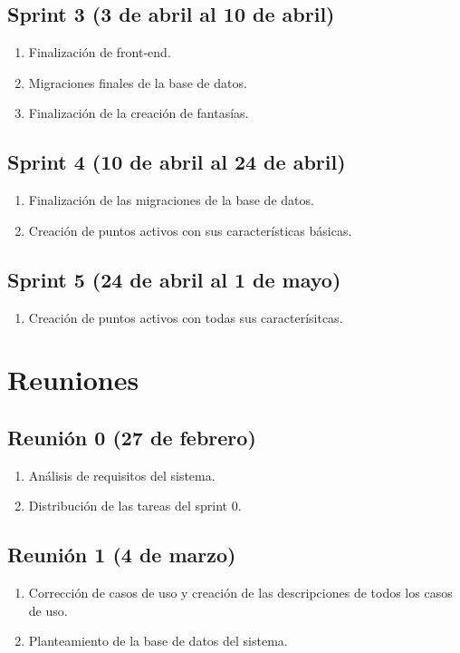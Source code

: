 \documentclass[12pt,letterpaper]{article}
\begin{document}
\subsection{Sprint 3 (3 de abril al 10 de abril)}
\begin{enumerate}
	\item Finalización de front-end.
	\item Migraciones finales de la base de datos.
	\item Finalización de la creación de fantasías.
\end{enumerate}

\subsection{Sprint 4 (10 de abril al 24 de abril)}
\begin{enumerate}
	\item Finalización de las migraciones de la base de datos.
	\item Creación de puntos activos con sus características básicas.
\end{enumerate}

\subsection{Sprint 5 (24 de abril al 1 de mayo)}
\begin{enumerate}
	\item Creación de puntos activos con todas sus caracterísitcas.
\end{enumerate}


\section{Reuniones}
\subsection{Reunión 0 (27 de febrero)}
\begin{enumerate}
	\item Análisis de requisitos del sistema.
	\item Distribución de las tareas del sprint 0.
\end{enumerate}

\subsection{Reunión 1 (4 de marzo)}
\begin{enumerate}
	\item Corrección de casos de uso y creación de las descripciones de todos los casos de uso.
	\item Planteamiento de la base de datos del sistema.
\end{enumerate}
\end{document}
